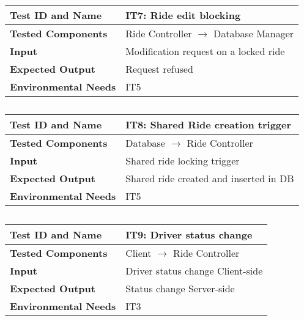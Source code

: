 \vspace{2em}

\noindent\begin{tabular}{l p{}}
    \hline
    \textbf{Test ID and Name} & IT7: Ride edit blocking\\
    \hline
    \textbf{Tested Components} & Ride Controller $\rightarrow$ Database Manager\\
    \hline
    \textbf{Input} & Modification request on a locked ride\\
    \hline
    \textbf{Expected Output} & Request refused\\
    \hline
    \textbf{Environmental Needs} & IT5\\
    \hline
\end{tabular}

\subsection{}

\begin{tabular}{l p{}}
    \hline
    \textbf{Test ID and Name} & IT8: Shared Ride creation trigger\\
    \hline
    \textbf{Tested Components} & Database $\rightarrow$ Ride Controller\\
    \hline
    \textbf{Input} & Shared ride locking trigger\\
    \hline
    \textbf{Expected Output} & Shared ride created and inserted in DB\\
    \hline
    \textbf{Environmental Needs} & IT5\\
    \hline
\end{tabular}

\subsection{}

\begin{tabular}{l p{}}
    \hline
    \textbf{Test ID and Name} & IT9: Driver status change\\
    \hline
    \textbf{Tested Components} & Client $\rightarrow$ Ride Controller\\
    \hline
    \textbf{Input} & Driver status change Client-side\\
    \hline
    \textbf{Expected Output} & Status change Server-side\\
    \hline
    \textbf{Environmental Needs} & IT3\\
    \hline
\end{tabular}


